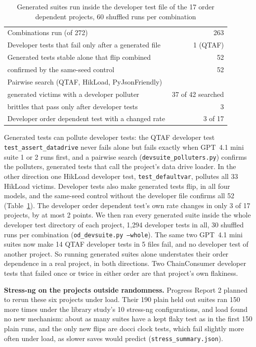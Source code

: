 \begin{table}[htbp]
\caption{Generated suites run inside the developer test file of the 17 order dependent projects, 60 shuffled runs per combination}
\label{tab:devsuite}
\small
\begin{tabular}{lr}
\toprule
Combinations run (of 272) & 263 \\
Developer tests that fail only after a generated file & 1 (QTAF) \\
Generated tests stable alone that flip combined & 52 \\
\quad confirmed by the same-seed control & 52 \\
Pairwise search (QTAF, HikLoad, PyJsonFriendly) & \\
\quad generated victims with a developer polluter & 37 of 42 searched \\
\quad brittles that pass only after developer tests & 3 \\
Developer order dependent test with a changed rate & 3 of 17 \\
\bottomrule
\end{tabular}
\end{table}

Generated tests can pollute developer tests: the QTAF developer test \texttt{test\_assert\_datadrive} never fails alone but fails exactly when GPT~4.1 mini suite 1 or 2 runs first, and a pairwise search (\texttt{devsuite\_polluters.py}) confirms the polluters, generated tests that call the project's data drive loader. In the other direction one HikLoad developer test, \texttt{test\_defaultvar}, pollutes all 33 HikLoad victims. Developer tests also make generated tests flip, in all four models, and the same-seed control without the developer file confirms all 52 (Table~\ref{tab:devsuite}). The developer order dependent test's own rate changes in only 3 of 17 projects, by at most 2 points. We then ran every generated suite inside the whole developer test directory of each project, 1,294 developer tests in all, 30 shuffled runs per combination (\texttt{od\_devsuite.py --whole}). The same two GPT~4.1 mini suites now make 14 QTAF developer tests in 5 files fail, and no developer test of another project. So running generated suites alone understates their order dependence in a real project, in both directions. Two ChainConsumer developer tests that failed once or twice in either order are that project's own flakiness.

\textbf{Stress-ng on the projects outside randomness.} Progress Report 2 planned to rerun these six projects under load. Their 190 plain held out suites ran 150 more times under the library study's 10 stress-ng configurations, and load found no new mechanism: about as many suites have a kept flaky test as in the first 150 plain runs, and the only new flips are docci clock tests, which fail slightly more often under load, as slower saves would predict (\texttt{stress\_summary.json}).

